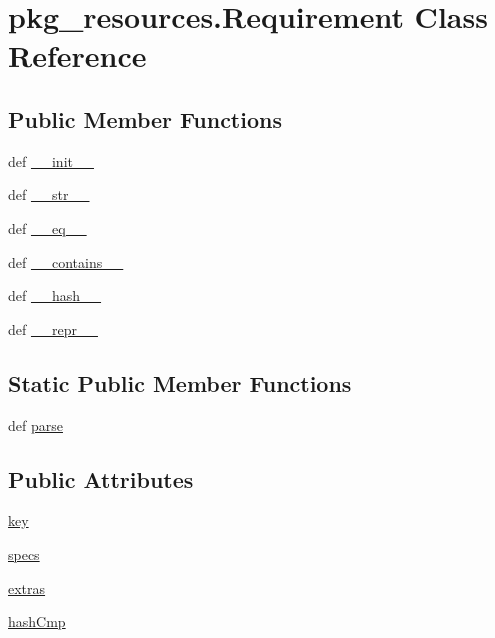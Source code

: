 \hypertarget{classpkg__resources_1_1Requirement}{}\section{pkg\+\_\+resources.\+Requirement Class Reference}
\label{classpkg__resources_1_1Requirement}
\subsection*{Public Member Functions}
\begin{DoxyCompactItemize}
\item 
def \hyperlink{classpkg__resources_1_1Requirement_a0a640507c949a12d701429d64696a538}{\+\_\+\+\_\+init\+\_\+\+\_\+}
\item 
def \hyperlink{classpkg__resources_1_1Requirement_a565b23c7f236c7f7ec2734138a2147c5}{\+\_\+\+\_\+str\+\_\+\+\_\+}
\item 
def \hyperlink{classpkg__resources_1_1Requirement_aee4db0dac6a11ed92c1906c7f8f6137d}{\+\_\+\+\_\+eq\+\_\+\+\_\+}
\item 
def \hyperlink{classpkg__resources_1_1Requirement_adaa37401d4499be047b946bf1afbbb59}{\+\_\+\+\_\+contains\+\_\+\+\_\+}
\item 
def \hyperlink{classpkg__resources_1_1Requirement_acf31bc58308e9da690b1215c336c3b2a}{\+\_\+\+\_\+hash\+\_\+\+\_\+}
\item 
def \hyperlink{classpkg__resources_1_1Requirement_a6f0430b4e80b5077b12e229a17683477}{\+\_\+\+\_\+repr\+\_\+\+\_\+}
\end{DoxyCompactItemize}
\subsection*{Static Public Member Functions}
\begin{DoxyCompactItemize}
\item 
def \hyperlink{classpkg__resources_1_1Requirement_ac364504b1b4494bd215a9082bc62468b}{parse}
\end{DoxyCompactItemize}
\subsection*{Public Attributes}
\begin{DoxyCompactItemize}
\item 
\hyperlink{classpkg__resources_1_1Requirement_a87c67bd2d8f19575cc4f0a5928b1cea9}{key}
\item 
\hyperlink{classpkg__resources_1_1Requirement_a1fce8b84c1951724bcd1b792a65a1be4}{specs}
\item 
\hyperlink{classpkg__resources_1_1Requirement_a6db71edd7cc700f63b3d0bfa715da67c}{extras}
\item 
\hyperlink{classpkg__resources_1_1Requirement_a13d1c727c4b2101a1db794d9784d9ca4}{hash\+Cmp}
\end{DoxyCompactItemize}


